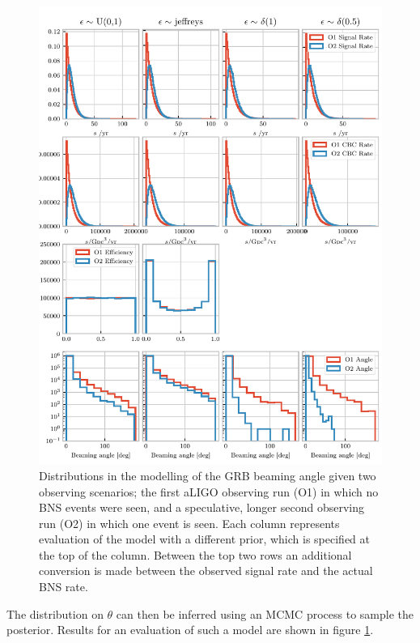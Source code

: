 \documentclass[openleft]{kentigern}
\theoremstyle{definition}
\begin{document}
\begin{figure}
  \centering
  \includegraphics{figures/grbbeamingpymc.pdf}
  \caption{Distributions in the modelling of the GRB beaming angle
    given two observing scenarios; the first aLIGO observing run (O1)
    in which no BNS events were seen, and a speculative, longer second
    observing run (O2) in which one event is seen. Each column
    represents evaluation of the model with a different prior, which
    is specified at the top of the column. Between the top two rows an
    additional conversion is made between the observed signal rate and
    the actual BNS rate.}
  \label{fig:grb-distributions}
\end{figure}

The distribution on $\theta$ can then be inferred using an MCMC
process to sample the posterior. Results for an evaluation of such a
model are shown in figure \ref{fig:grb-distributions}.


%
% 
\end{document}
